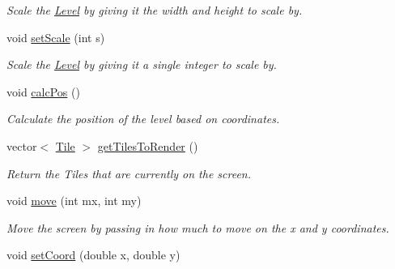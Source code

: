 \begin{DoxyCompactItemize}
\begin{DoxyCompactList}\small\item\em Scale the \hyperlink{classLevel}{Level} by giving it the width and height to scale by. \end{DoxyCompactList}\item 
void \hyperlink{classLevel_af6fe8bc2dd6623fcbaa739403a239d77}{set\+Scale} (int s)\hypertarget{classLevel_af6fe8bc2dd6623fcbaa739403a239d77}{}\label{classLevel_af6fe8bc2dd6623fcbaa739403a239d77}

\begin{DoxyCompactList}\small\item\em Scale the \hyperlink{classLevel}{Level} by giving it a single integer to scale by. \end{DoxyCompactList}\item 
void \hyperlink{classLevel_a02e915f95e181dcfe95553e923a73a39}{calc\+Pos} ()\hypertarget{classLevel_a02e915f95e181dcfe95553e923a73a39}{}\label{classLevel_a02e915f95e181dcfe95553e923a73a39}

\begin{DoxyCompactList}\small\item\em Calculate the position of the level based on coordinates. \end{DoxyCompactList}\item 
vector$<$ \hyperlink{classTile}{Tile} $>$ \hyperlink{classLevel_ade9e45f70f2f3f81c120bb161f87218f}{get\+Tiles\+To\+Render} ()\hypertarget{classLevel_ade9e45f70f2f3f81c120bb161f87218f}{}\label{classLevel_ade9e45f70f2f3f81c120bb161f87218f}

\begin{DoxyCompactList}\small\item\em Return the Tiles that are currently on the screen. \end{DoxyCompactList}\item 
void \hyperlink{classLevel_a9184b25173fbf468a63a633bd3510bd6}{move} (int mx, int my)\hypertarget{classLevel_a9184b25173fbf468a63a633bd3510bd6}{}\label{classLevel_a9184b25173fbf468a63a633bd3510bd6}

\begin{DoxyCompactList}\small\item\em Move the screen by passing in how much to move on the x and y coordinates. \end{DoxyCompactList}\item 
void \hyperlink{classLevel_a3ff79425060f959496d64aa052ef3cf6}{set\+Coord} (double x, double y)\hypertarget{classLevel_a3ff79425060f959496d64aa052ef3cf6}{}\label{classLevel_a3ff79425060f959496d64aa052ef3cf6}


\end{DoxyCompactItemize}
